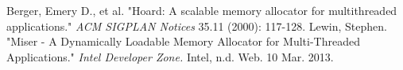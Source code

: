 \documentclass{article}
\begin{document}
\newpage

\begin{thebibliography}{9}
	
		Berger, Emery D., et al.
		"Hoard: A scalable memory allocator for multithreaded applications."
		\textit{ACM SIGPLAN Notices} 35.11 
		(2000): 
		117-128.
		Lewin, Stephen.
		"Miser - A Dynamically Loadable Memory Allocator for Multi-Threaded Applications."
		\textit{Intel Developer Zone.}
		Intel, 
		n.d. Web. 10 Mar. 2013.

\end{thebibliography}
\end{document}
